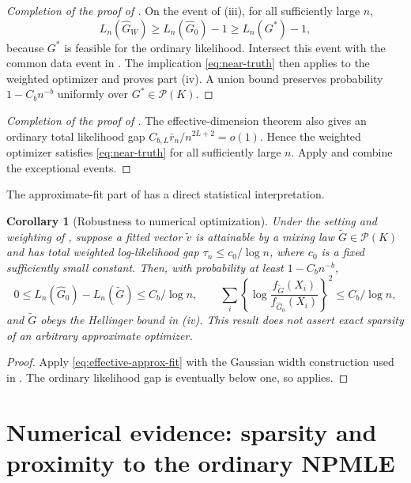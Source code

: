 \documentclass[11pt]{article}
\newtheorem{corollary}[corollary]{Corollary}
\theoremstyle{definition}
\theoremstyle{remark}
\newcommand{\Pcal}{\mathcal P}
\newcommand{\Ghat}{\widehat G}
\newcommand{\Gtil}{\widetilde G}
\newcommand{\vtil}{\widetilde v}
\begin{document}
\begin{proof}[Completion of the proof of ]
On the event of (iii), for all sufficiently large $n$,
\[
 L_n(\Ghat_W)\ge L_n(\Ghat_0)-1\ge L_n(G^*)-1,
\]
because $G^*$ is feasible for the ordinary likelihood.  Intersect this event
with the common data event in .  The implication
\eqref{eq:near-truth} then applies to the weighted optimizer and proves part
(iv).  A union bound preserves probability $1-C_bn^{-b}$ uniformly over
$G^*\in\Pcal(K)$.
\end{proof}

\begin{proof}[Completion of the proof of ]
The effective-dimension theorem also gives an ordinary total likelihood gap
$C_{b,L}\bar r_n/n^{2L+2}=o(1)$.  Hence the weighted optimizer satisfies
\eqref{eq:near-truth} for all sufficiently large $n$.  Apply
 and combine the exceptional events.
\end{proof}

The approximate-fit part of  has a direct statistical
interpretation.

\begin{corollary}[Robustness to numerical optimization]
\label{cor:approx}
Under the setting and weighting of , suppose a fitted vector
$\vtil$ is attainable by a mixing law $\Gtil\in\Pcal(K)$ and has total
weighted log-likelihood gap $\tau_n\le c_0/\log n$, where $c_0$ is a fixed
sufficiently small constant.  Then, with probability at least $1-C_bn^{-b}$,
\[
 0\le L_n(\Ghat_0)-L_n(\Gtil)\le C_b/\log n,
 \qquad
 \sum_i\left\{\log\frac{f_{\Gtil}(X_i)}
 {f_{\Ghat_0}(X_i)}\right\}^2\le C_b/\log n,
\]
and $\Gtil$ obeys the Hellinger bound in (iv).  This result
does not assert exact sparsity of an arbitrary approximate optimizer.
\end{corollary}

\begin{proof}
Apply \eqref{eq:effective-approx-fit} with the Gaussian width construction
used in .  The ordinary likelihood gap is eventually
below one, so  applies.
\end{proof}


\section{Numerical evidence: sparsity and proximity to the ordinary NPMLE}
\label{sec:numerics}
\end{document}

